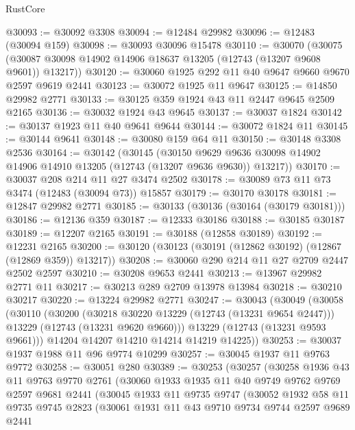 \begin{lexlean}{RustCore}
\begin{coremodule}
@30093 := @30092 @3308
@30094 := @12484 @29982
@30096 := @12483 (@30094 @159)
@30098 := @30093 @30096 @15478
@30110 := @30070
    (@30075 (@30087 @30098 @14902 @14906 @18637 @13205 (@12743 (@13207 @9608 @9601)) @13217))
@30120 := @30060 @1925 @292 @11 @40 @9647 @9660 @9670 @2597 @9619 @2441
@30123 := @30072 @1925 @11 @9647
@30125 := @14850 @29982 @2771
@30133 := @30125 @359 @1924 @43 @11 @2447 @9645 @2509 @2165
@30136 := @30032 @1924 @43 @9645
@30137 := @30037 @1824
@30142 := @30137 @1923 @11 @40 @9641 @9644
@30144 := @30072 @1824 @11
@30145 := @30144 @9641
@30148 := @30080 @159 @64 @11
@30150 := @30148 @3308 @2536
@30164 := @30142
    (@30145
      (@30150 @9629 @9636 @30098 @14902 @14906 @14910 @13205 (@12743 (@13207 @9636 @9630)) @13217))
@30170 := @30037 @208 @214 @11 @27 @3474 @2502
@30178 := @30089 @73 @11 @73 @3474 (@12483 (@30094 @73)) @15857
@30179 := @30170 @30178
@30181 := @12847 @29982 @2771
@30185 := @30133 (@30136 (@30164 (@30179 @30181)))
@30186 := @12136 @359
@30187 := @12333 @30186
@30188 := @30185 @30187
@30189 := @12207 @2165
@30191 := @30188 (@12858 @30189)
@30192 := @12231 @2165
@30200 := @30120 (@30123 (@30191 (@12862 @30192) (@12867 (@12869 @359)) @13217))
@30208 := @30060 @290 @214 @11 @27 @2709 @2447 @2502 @2597
@30210 := @30208 @9653 @2441
@30213 := @13967 @29982 @2771 @11
@30217 := @30213 @289 @2709 @13978 @13984
@30218 := @30210 @30217
@30220 := @13224 @29982 @2771
@30247 := @30043
    (@30049
      (@30058
        (@30110
          (@30200
            (@30218 @30220 @13229 (@12743 (@13231 @9654 @2447)))
            @13229
            (@12743 (@13231 @9620 @9660)))
          @13229
          (@12743 (@13231 @9593 @9661)))
        @14204
        @14207
        @14210
        @14214
        @14219
        @14225))
@30253 := @30037 @1937 @1988 @11 @96 @9774 @10299
@30257 := @30045 @1937 @11 @9763 @9772
@30258 := @30051 @280
@30389 := @30253
    (@30257
      (@30258
        @1936
        @43
        @11
        @9763
        @9770
        @2761
        (@30060
          @1933
          @1935
          @11
          @40
          @9749
          @9762
          @9769
          @2597
          @9681
          @2441
          (@30045
            @1933
            @11
            @9735
            @9747
            (@30052
              @1932
              @58
              @11
              @9735
              @9745
              @2823
              (@30061
                @1931
                @11
                @43
                @9710
                @9734
                @9744
                @2597
                @9689
                @2441

\end{coremodule}
\end{lexlean}
